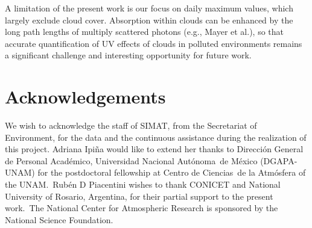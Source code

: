 \documentclass[10pt]{article}
\begin{document}
A limitation of the present work is our focus on daily maximum values,
which largely exclude cloud cover. Absorption within clouds can be
enhanced by the long path lengths of multiply scattered photons (e.g.,
Mayer et al.\cite{Mayer_1998}), so that accurate quantification of UV
effects of clouds in polluted environments remains a significant
challenge and interesting opportunity for future work.~

\section*{Acknowledgements}\label{acknowledgements}

We wish to acknowledge the staff of SIMAT, from the Secretariat of
Environment, for the data and the continuous assistance during the
realization of this project. Adriana Ipiña would like to extend her
thanks to Dirección General de Personal Académico, Universidad
Nacional Autónoma~de México (DGAPA-UNAM) for the postdoctoral fellowship
at Centro de Ciencias~de la Atmósfera of the UNAM.~Rubén D Piacentini
wishes to thank CONICET and National University of Rosario, Argentina,
for their partial support to the present work.~The National Center for
Atmospheric Research is sponsored by the National Science Foundation.



\end{document}
